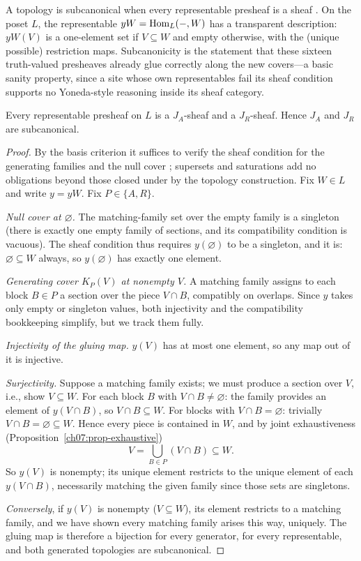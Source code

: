 A topology is subcanonical when every representable presheaf is a sheaf \cite{stacks00WO}. On the poset $L$, the representable $yW=\mathrm{Hom}_{L}(-,W)$ has a transparent description: $yW(V)$ is a one-element set if $V\subseteq W$ and empty otherwise, with the (unique possible) restriction maps. Subcanonicity is the statement that these sixteen truth-valued presheaves already glue correctly along the new covers---a basic sanity property, since a site whose own representables fail its sheaf condition supports no Yoneda-style reasoning inside its sheaf category.

\begin{theorem}\label{ch09:thm-nt22}
Every representable presheaf on $L$ is a $J_{A}$-sheaf and a $J_{R}$-sheaf. Hence $J_{A}$ and $J_{R}$ are subcanonical.
\end{theorem}

\begin{proof}
By the basis criterion it suffices to verify the sheaf condition for the generating families and the null cover \cite{stacks00ZC}; supersets and saturations add no obligations beyond those closed under by the topology construction. Fix $W\in L$ and write $y=yW$. Fix $P\in\{A,R\}$.

\emph{Null cover at $\varnothing$.} The matching-family set over the empty family is a singleton (there is exactly one empty family of sections, and its compatibility condition is vacuous). The sheaf condition thus requires $y(\varnothing)$ to be a singleton, and it is: $\varnothing\subseteq W$ always, so $y(\varnothing)$ has exactly one element.

\emph{Generating cover $K_{P}(V)$ at nonempty $V$.} A matching family assigns to each block $B\in P$ a section over the piece $V\cap B$, compatibly on overlaps. Since $y$ takes only empty or singleton values, both injectivity and the compatibility bookkeeping simplify, but we track them fully.

\emph{Injectivity of the gluing map.} $y(V)$ has at most one element, so any map out of it is injective.

\emph{Surjectivity.} Suppose a matching family exists; we must produce a section over $V$, i.e., show $V\subseteq W$. For each block $B$ with $V\cap B\neq\varnothing$: the family provides an element of $y(V\cap B)$, so $V\cap B\subseteq W$. For blocks with $V\cap B=\varnothing$: trivially $V\cap B=\varnothing\subseteq W$. Hence every piece is contained in $W$, and by joint exhaustiveness (Proposition~\ref{ch07:prop-exhaustive})
\[
V=\bigcup_{B\in P}(V\cap B)\subseteq W .
\]
So $y(V)$ is nonempty; its unique element restricts to the unique element of each $y(V\cap B)$, necessarily matching the given family since those sets are singletons.

\emph{Conversely}, if $y(V)$ is nonempty ($V\subseteq W$), its element restricts to a matching family, and we have shown every matching family arises this way, uniquely. The gluing map is therefore a bijection for every generator, for every representable, and both generated topologies are subcanonical.
\end{proof}

